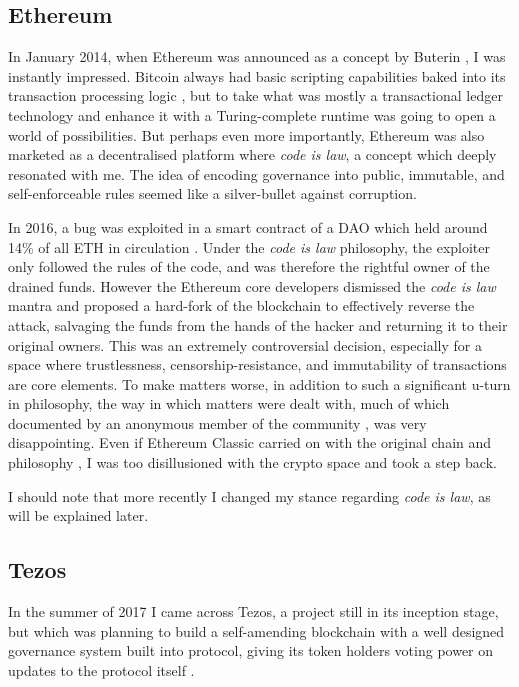 \subsection*{Ethereum}

In January 2014, when Ethereum was announced as a concept by Buterin \citeyear{buterinEthereumNextGenerationCryptocurrency2014}, I was instantly impressed. Bitcoin always had basic scripting capabilities baked into its transaction processing logic \cite{ScriptBitcoinWiki2024}, but to take what was mostly a transactional ledger technology and enhance it with a Turing-complete runtime was going to open a world of possibilities. But perhaps even more importantly, Ethereum was also marketed as a decentralised platform where \emph{\gls{code is law}}, a concept which deeply resonated with me. The idea of encoding governance into public, immutable, and self-enforceable rules seemed like a silver-bullet against corruption.

In 2016, a bug was exploited in a smart contract of a DAO which held around 14\% of all ETH in circulation \cite{morrisCoinDeskTurns102023}. Under the \emph{code is law} philosophy, the exploiter only followed the rules of the code, and was therefore the rightful owner of the drained funds. However the Ethereum core developers dismissed the \emph{code is law} mantra and proposed a hard-fork of the blockchain \cite{buterinCRITICALUPDATERe2016} to effectively reverse the attack, salvaging the funds from the hands of the hacker and returning it to their original owners. This was an extremely controversial decision, especially for a space where trustlessness, censorship-resistance, and immutability of transactions are core elements. To make matters worse, in addition to such a significant u-turn in philosophy, the way in which matters were dealt with, much of which documented by an anonymous member of the community \cite{yourstruly1DAOHistoryIt2018}, was very disappointing. Even if Ethereum Classic carried on with the original chain and philosophy \cite{CodeLaw2022}, I was too disillusioned with the crypto space and took a step back.

I should note that more recently I changed my stance regarding \emph{code is law}, as will be explained later.


\subsection*{Tezos}

In the summer of 2017 I came across Tezos, a project still in its inception stage, but which was planning to build a self-amending blockchain with a well designed governance system built into protocol, giving its token holders voting power on updates to the protocol itself \cite{goodmanTezosSelfamendingCryptoledger2014a} . 



